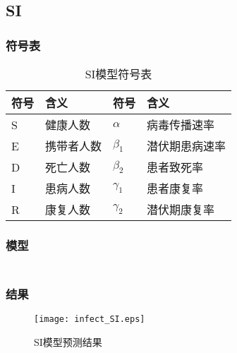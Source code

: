 \subsection{SI}
\subsubsection{符号表}
\begin{table}[H]
	\centering
	\caption{SI模型符号表}
	\begin{tabular}{llll}
		\hline
		符号&含义&符号&含义\\
		\hline
		S&健康人数&$\alpha$&病毒传播速率\\
		E&携带者人数&$\beta_1$&潜伏期患病速率\\
		D&死亡人数&$\beta_2$&患者致死率\\
		I&患病人数&$\gamma_1$&患者康复率\\
		R&康复人数&$\gamma_2$&潜伏期康复率\\
		\hline
	\end{tabular}
\end{table} 
\subsubsection{模型}
	\begin{align}
	\end{align}
\subsubsection{结果}
	\begin{figure}[H]
		\centering
		\texttt{[image: infect\_SI.eps]}
		\caption{SI模型预测结果}
	\end{figure}
